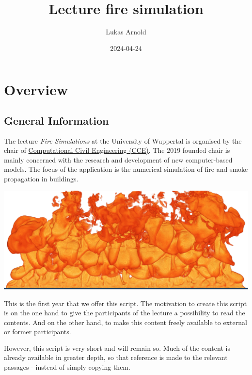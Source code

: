\documentclass[
  letterpaper,
  DIV=11,
  numbers=noendperiod]{scrreprt}
\title{Lecture fire simulation}
\author{Lukas Arnold}
\date{2024-04-24}
\renewcommand*\contentsname{Table of contents}
\newcommand\contentsname{Table of contents}
\begin{document}
\maketitle

\renewcommand*\contentsname{Table of contents}
{
\hypersetup{linkcolor=}
\setcounter{tocdepth}{2}
\tableofcontents
}

\chapter*{Overview}\label{overview}


\section*{General Information}\label{general-information}


The lecture \emph{Fire Simulations} at the University of Wuppertal is
organised by the chair of
\href{https://cce.uni-wuppertal.de/}{Computational Civil Engineering
(CCE)}. The 2019 founded chair is mainly concerned with the research and
development of new computer-based models. The focus of the application
is the numerical simulation of fire and smoke propagation in buildings.

\includegraphics{./content/00_overview/figs/fire_banner.png}

This is the first year that we offer this script. The motivation to
create this script is on the one hand to give the participants of the
lecture a possibility to read the contents. And on the other hand, to
make this content freely available to external or former participants.

However, this script is very short and will remain so. Much of the
content is already available in greater depth, so that reference is made
to the relevant passages - instead of simply copying them.
\end{document}
